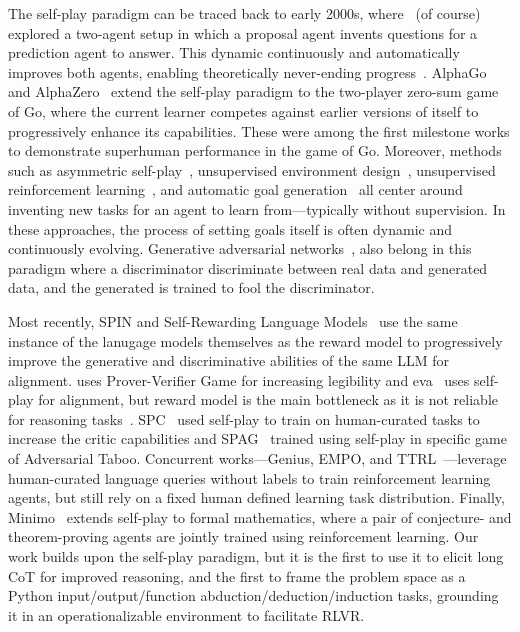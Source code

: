 \documentclass{article}
\begin{document}
The self-play paradigm can be traced back to early 2000s, where~\citet{schmidhuber2003exploring,schmidhuber2013powerplay} (of course) explored a two-agent setup in which a proposal agent invents questions for a prediction agent to answer. This dynamic continuously and automatically improves both agents, enabling theoretically never-ending progress~\citep{schaul2024boundless}. AlphaGo and AlphaZero~\citep{silver2016mastering,silver2017mastering} extend the self-play paradigm to the two-player zero-sum game of Go, where the current learner competes against earlier versions of itself to progressively enhance its capabilities. These were among the first milestone works to demonstrate superhuman performance in the game of Go. Moreover, methods such as asymmetric self-play~\citep{sukhbaatar2017intrinsic,openai2021asymmetric}, unsupervised environment design~\citep{wang2019paired,dennis2020emergent}, unsupervised reinforcement learning~\citep{laskin2021urlb,zhao2022mixture,zhao2025self}, and automatic goal generation~\citep{florensa2018automatic} all center around inventing new tasks for an agent to learn from—typically without supervision. In these approaches, the process of setting goals itself is often dynamic and continuously evolving. Generative adversarial networks~\citep{goodfellow2020generative}, also belong in this paradigm where a discriminator discriminate between real data and generated data, and the generated is trained to fool the discriminator.

Most recently, SPIN and Self-Rewarding Language Models~\citep{chen2024self,yuan2401self} use the same instance of the lanugage models themselves as the reward model to progressively improve the generative and discriminative abilities of the same LLM for alignment. \cite{kirchner2024prover} uses Prover-Verifier Game for increasing legibility and eva~\citep{DBLP:journals/corr/abs-2411-00062} uses self-play for alignment, but reward model is the main bottleneck as it is not reliable for reasoning tasks~\citep{lambert2024t}. SPC~\cite{chen2025spcevolvingselfplaycritic} used self-play to train on human-curated tasks to increase the critic capabilities and SPAG~\cite{DBLP:conf/nips/ChengHXZDHDL24} trained using self-play in specific game of Adversarial Taboo. Concurrent works—Genius, EMPO, and TTRL~\citep{xu2025geniusgeneralizablepurelyunsupervised, zhang2025rightquestionhalfanswer, zuo2025ttrltesttimereinforcementlearning}—leverage human-curated language queries without labels to train reinforcement learning agents, but still rely on a fixed human defined learning task distribution. Finally, Minimo~\citep{poesia2024learning} extends self-play to formal mathematics, where a pair of conjecture- and theorem-proving agents are jointly trained using reinforcement learning. Our work builds upon the self-play paradigm, but it is the first to use it to elicit long CoT for improved reasoning, and the first to frame the problem space as a Python input/output/function abduction/deduction/induction tasks, grounding it in an operationalizable environment to facilitate RLVR.
\end{document}
